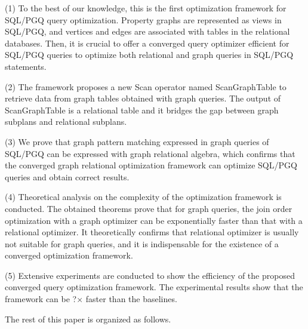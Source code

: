 (1) To the best of our knowledge, this is the first optimization framework for SQL/PGQ query optimization.
Property graphs are represented as views in SQL/PGQ, and vertices and edges are associated with tables in the relational databases.
Then, it is crucial to offer a converged query optimizer efficient for SQL/PGQ queries to optimize both relational and graph queries in SQL/PGQ statements.

(2) The framework proposes a new Scan operator named ScanGraphTable to retrieve data from graph tables obtained with graph queries.
The output of ScanGraphTable is a relational table and it bridges the gap between graph subplans and relational subplans.

(3) We prove that graph pattern matching expressed in graph queries of SQL/PGQ can be expressed with graph relational algebra, which confirms that the converged graph relational optimization framework can optimize SQL/PGQ queries and obtain correct results.



(4) Theoretical analysis on the complexity of the optimization framework is conducted.
The obtained theorems prove that for graph queries, the join order optimization with a graph optimizer can be exponentially faster than that with a relational optimizer. 
It theoretically confirms that relational optimizer is usually not suitable for graph queries, and it is indispensable for the existence of a converged optimization framework.

(5) Extensive experiments are conducted to show the efficiency of the proposed converged query optimization framework.
The experimental results show that the framework can be ?$\times$ faster than the baselines.

The rest of this paper is organized as follows.


